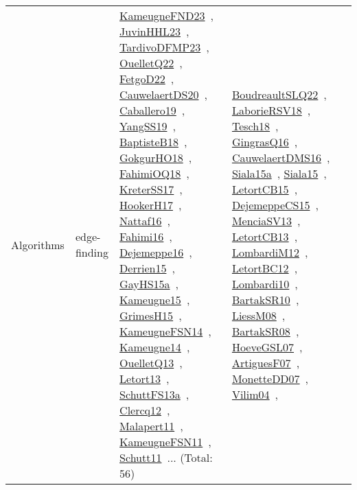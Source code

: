{\begin{longtable}{lp{3cm}>{\raggedright\arraybackslash}p{6cm}>{\raggedright\arraybackslash}p{6cm}>{\raggedright\arraybackslash}p{8cm}}
Algorithms & edge-finding & \href{../works/KameugneFND23.pdf}{KameugneFND23}~\cite{KameugneFND23}, \href{../works/JuvinHHL23.pdf}{JuvinHHL23}~\cite{JuvinHHL23}, \href{../works/TardivoDFMP23.pdf}{TardivoDFMP23}~\cite{TardivoDFMP23}, \href{../works/OuelletQ22.pdf}{OuelletQ22}~\cite{OuelletQ22}, \href{../works/FetgoD22.pdf}{FetgoD22}~\cite{FetgoD22}, \href{../works/CauwelaertDS20.pdf}{CauwelaertDS20}~\cite{CauwelaertDS20}, \href{../works/Caballero19.pdf}{Caballero19}~\cite{Caballero19}, \href{../works/YangSS19.pdf}{YangSS19}~\cite{YangSS19}, \href{../works/BaptisteB18.pdf}{BaptisteB18}~\cite{BaptisteB18}, \href{../works/GokgurHO18.pdf}{GokgurHO18}~\cite{GokgurHO18}, \href{../works/FahimiOQ18.pdf}{FahimiOQ18}~\cite{FahimiOQ18}, \href{../works/KreterSS17.pdf}{KreterSS17}~\cite{KreterSS17}, \href{../works/HookerH17.pdf}{HookerH17}~\cite{HookerH17}, \href{../works/Nattaf16.pdf}{Nattaf16}~\cite{Nattaf16}, \href{../works/Fahimi16.pdf}{Fahimi16}~\cite{Fahimi16}, \href{../works/Dejemeppe16.pdf}{Dejemeppe16}~\cite{Dejemeppe16}, \href{../works/Derrien15.pdf}{Derrien15}~\cite{Derrien15}, \href{../works/GayHS15a.pdf}{GayHS15a}~\cite{GayHS15a}, \href{../works/Kameugne15.pdf}{Kameugne15}~\cite{Kameugne15}, \href{../works/GrimesH15.pdf}{GrimesH15}~\cite{GrimesH15}, \href{../works/KameugneFSN14.pdf}{KameugneFSN14}~\cite{KameugneFSN14}, \href{../works/Kameugne14.pdf}{Kameugne14}~\cite{Kameugne14}, \href{../works/OuelletQ13.pdf}{OuelletQ13}~\cite{OuelletQ13}, \href{../works/Letort13.pdf}{Letort13}~\cite{Letort13}, \href{../works/SchuttFS13a.pdf}{SchuttFS13a}~\cite{SchuttFS13a}, \href{../works/Clercq12.pdf}{Clercq12}~\cite{Clercq12}, \href{../works/Malapert11.pdf}{Malapert11}~\cite{Malapert11}, \href{../works/KameugneFSN11.pdf}{KameugneFSN11}~\cite{KameugneFSN11}, \href{../works/Schutt11.pdf}{Schutt11}~\cite{Schutt11}... (Total: 56) & \href{../works/BoudreaultSLQ22.pdf}{BoudreaultSLQ22}~\cite{BoudreaultSLQ22}, \href{../works/LaborieRSV18.pdf}{LaborieRSV18}~\cite{LaborieRSV18}, \href{../works/Tesch18.pdf}{Tesch18}~\cite{Tesch18}, \href{../works/GingrasQ16.pdf}{GingrasQ16}~\cite{GingrasQ16}, \href{../works/CauwelaertDMS16.pdf}{CauwelaertDMS16}~\cite{CauwelaertDMS16}, \href{../works/Siala15a.pdf}{Siala15a}~\cite{Siala15a}, \href{../works/Siala15.pdf}{Siala15}~\cite{Siala15}, \href{../works/LetortCB15.pdf}{LetortCB15}~\cite{LetortCB15}, \href{../works/DejemeppeCS15.pdf}{DejemeppeCS15}~\cite{DejemeppeCS15}, \href{../works/MenciaSV13.pdf}{MenciaSV13}~\cite{MenciaSV13}, \href{../works/LetortCB13.pdf}{LetortCB13}~\cite{LetortCB13}, \href{../works/LombardiM12.pdf}{LombardiM12}~\cite{LombardiM12}, \href{../works/LetortBC12.pdf}{LetortBC12}~\cite{LetortBC12}, \href{../works/Lombardi10.pdf}{Lombardi10}~\cite{Lombardi10}, \href{../works/BartakSR10.pdf}{BartakSR10}~\cite{BartakSR10}, \href{../works/LiessM08.pdf}{LiessM08}~\cite{LiessM08}, \href{../works/BartakSR08.pdf}{BartakSR08}~\cite{BartakSR08}, \href{../works/HoeveGSL07.pdf}{HoeveGSL07}~\cite{HoeveGSL07}, \href{../works/ArtiguesF07.pdf}{ArtiguesF07}~\cite{ArtiguesF07}, \href{../works/MonetteDD07.pdf}{MonetteDD07}~\cite{MonetteDD07}, \href{../works/Vilim04.pdf}{Vilim04}~\cite{Vilim04}, 
\end{longtable}}
